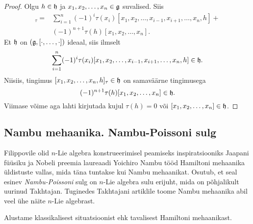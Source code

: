 \begin{proof}
    Olgu $h \in \mathfrak{h}$ ja $x_1, x_2, \dots, x_n \in \mathfrak{g}$ suvalised. Siis
    \begin{align*}
        [x_1, x_2, \dots, x_n, h]_\tau =  &\sum_{i=1}^{n} (-1)^i \tau(x_i)
        [x_1, x_2, \dots, x_{i-1}, x_{i+1}, \dots, x_n, h] + \\
        &(-1)^{n+1} \tau(h) [x_1, x_2, \dots, x_n].
    \end{align*}
    Et $\mathfrak{h}$ on $(\mathfrak{g}, [\cdot, \dots, \cdot])$ ideaal, siis ilmselt
    \begin{align*}
        \sum_{i=1}^{n} (-1)^i \tau(x_i)
        [x_1, x_2, \dots, x_{i-1}, x_{i+1}, \dots, x_n, h] \in \mathfrak{h}.
    \end{align*}
    Niisiis, tingimus $[x_1, x_2, \dots, x_n, h]_\tau \in \mathfrak{h}$ on
    samaväärne tingimusega
    \[ (-1)^{n+1} \tau(h) [x_1, x_2, \dots, x_n] \in \mathfrak{h}. \]
    Viimase võime aga lahti kirjutada kujul
    $\tau(h) = 0$ või $[x_1, x_2, \dots, x_n] \in \mathfrak{h}$.
\end{proof}

\subsection{Nambu mehaanika. Nambu-Poissoni sulg}

Filippovile olid $n$-Lie algebra konstrueerimisel peamiseks
inspiratsiooniks Jaapani füüsiku ja Nobeli preemia laureaadi
Yoichiro Nambu tööd Hamiltoni mehaanika
üldistuste vallas, mida täna tuntakse kui Nambu mehaanikat. Osutub, et
seal esinev \emph{Nambu-Poissoni} sulg on $n$-Lie algebra sulu erijuht,
mida on põhjalikult uurinud Takhtajan. Tuginedes Takhtajani artiklile
\cite{takhtajan1994} toome Nambu mehaanika abil veel ühe
näite $n$-Lie algebrast.

Alustame klassikalisest situatsioonist ehk tavalisest Hamiltoni mehaanikast.

